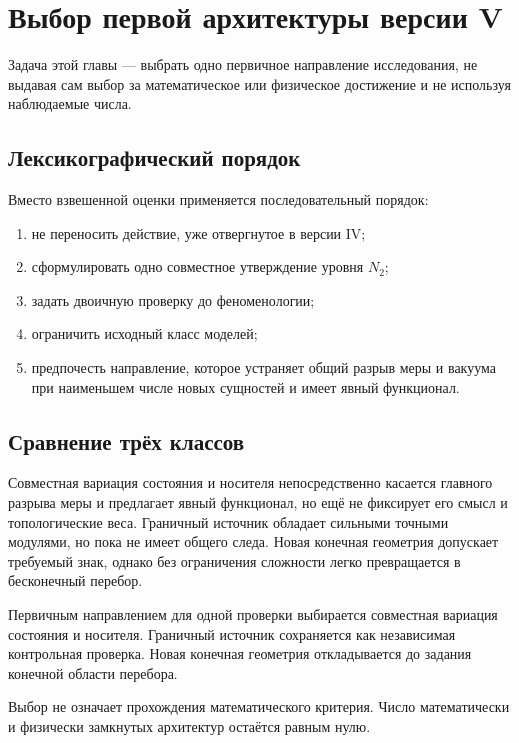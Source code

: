 \chapter{Выбор первой архитектуры версии V}

Задача этой главы --- выбрать одно первичное направление исследования, не
выдавая сам выбор за математическое или физическое достижение и не используя
наблюдаемые числа.

\section{Лексикографический порядок}

Вместо взвешенной оценки применяется последовательный порядок:
\begin{enumerate}
 \item не переносить действие, уже отвергнутое в версии IV;
 \item сформулировать одно совместное утверждение уровня \(N_2\);
 \item задать двоичную проверку до феноменологии;
 \item ограничить исходный класс моделей;
 \item предпочесть направление, которое устраняет общий разрыв меры и
 вакуума при наименьшем числе новых сущностей и имеет явный функционал.
\end{enumerate}

\section{Сравнение трёх классов}

Совместная вариация состояния и носителя непосредственно касается главного
разрыва меры и предлагает явный функционал, но ещё не фиксирует его смысл и
топологические веса. Граничный источник обладает сильными точными модулями,
но пока не имеет общего следа. Новая конечная геометрия допускает требуемый
знак, однако без ограничения сложности легко превращается в бесконечный
перебор.

\begin{proposition}
Первичным направлением для одной проверки выбирается совместная вариация
состояния и носителя. Граничный источник сохраняется как независимая
контрольная проверка. Новая конечная геометрия откладывается до задания
конечной области перебора.
\end{proposition}

Выбор не означает прохождения математического критерия. Число
математически и физически замкнутых архитектур остаётся равным нулю.

